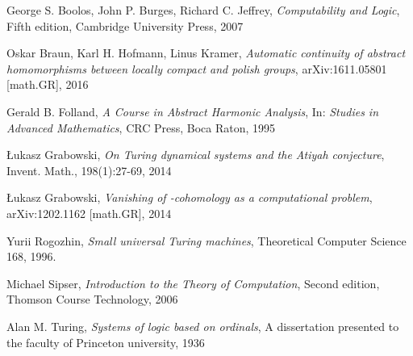 \begin{thebibliography}{1}

	George S. Boolos, John P. Burges, Richard C. Jeffrey,
	\emph{Computability and Logic},
	Fifth edition,
	Cambridge University Press,
	2007

	Oskar Braun, Karl H. Hofmann, Linus Kramer,
	\emph{Automatic continuity of abstract homomorphisms between locally compact and polish groups},
	arXiv:1611.05801 [math.GR],
	2016

	Gerald B. Folland,
	\emph{A Course in Abstract Harmonic Analysis},
	In: \emph{Studies in Advanced Mathematics},
	CRC Press,
	Boca Raton,
	1995

	\L{}ukasz Grabowski,
	\emph{On Turing dynamical systems and the Atiyah conjecture},
	Invent. Math., 198(1):27-69,
	2014

	\L{}ukasz Grabowski,
	\emph{Vanishing of \ltwo-cohomology as a computational problem},
	arXiv:1202.1162 [math.GR],
	2014
	
	Yurii Rogozhin,
	\emph{Small universal Turing machines},
	Theoretical Computer Science 168,
	1996.

	Michael Sipser,
	\emph{Introduction to the Theory of Computation},
	Second edition,
	Thomson Course Technology,
	2006

	Alan M. Turing,
	\emph{Systems of logic based on ordinals},
	A dissertation presented to the faculty of Princeton university,
	1936

\end{thebibliography}
